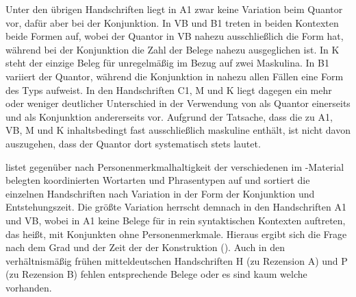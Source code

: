 Unter den übrigen Handschriften liegt in A1 zwar keine Variation beim Quantor
vor, dafür aber bei der Konjunktion. In VB und B1 treten in beiden Kontexten
beide Formen auf, wobei der Quantor in VB nahezu ausschließlich die Form
 hat, während bei der Konjunktion die Zahl der Belege nahezu
ausgeglichen ist. In K steht der einzige Beleg für 
unregelmäßig im Bezug auf zwei Maskulina. In B1 variiert der
Quantor, während die Konjunktion in nahezu allen Fällen eine Form des Typs
 aufweist. In den Handschriften C1, M und K liegt dagegen ein mehr
oder weniger deutlicher Unterschied in der Verwendung von  als
Quantor einerseits und  als Konjunktion andererseits vor. Aufgrund
der Tatsache, dass die  zu A1, VB, M und K inhaltsbedingt fast
ausschließlich maskuline  enthält, ist nicht davon auszugehen,
dass der Quantor dort systematisch stets  lautet.

 listet  gegenüber  nach
Personenmerkmalhaltigkeit der verschiedenen im
\KC{}-Material belegten koordinierten Wortarten und Phrasentypen auf und
sortiert die einzelnen Handschriften nach Variation in der Form der Konjunktion
und Entstehungszeit. Die größte Varia\-tion herrscht demnach in den
Handschriften A1 und VB, wobei in A1 keine Belege für 
in rein syntaktischen Kontexten auftreten, das heißt, mit Konjunkten ohne
Personen\-merkmale. Hieraus ergibt sich die Frage nach dem Grad und der Zeit
der  der Konstruktion (). Auch
in den verhältnismäßig frühen mitteldeutschen Handschriften H
(zu Rezension A) und P (zu Rezension B) fehlen entsprechende Belege oder es
sind kaum welche vorhanden.

